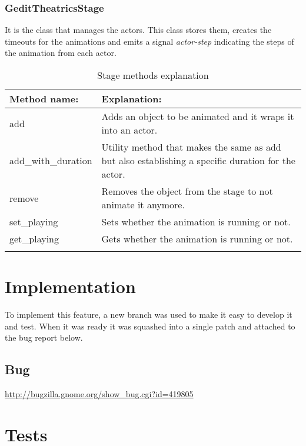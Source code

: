 \newpage
\subsubsection{GeditTheatricsStage}

It is the class that manages the actors. This class stores them, creates the timeouts for the animations and emits a signal \emph{actor-step} indicating the steps of the animation from each actor.

\begin{table}[H]
  \begin{center}
    \begin{tabularx}{\textwidth}{|X|X|}
      \firsthline
      \textbf{Method name:} & \textbf{Explanation:} \\
      \hline
      add & Adds an object to be animated and it wraps it into an actor. \\
      \hline
      add\_with\_duration & Utility method that makes the same as add but also establishing a specific duration for the actor. \\
      \hline
      remove & Removes the object from the stage to not animate it anymore. \\
      \hline
      set\_playing & Sets whether the animation is running or not. \\
      \hline
      get\_playing & Gets whether the animation is running or not. \\
      \lasthline
    \end{tabularx}
    \caption{Stage methods explanation}
  \end{center}
\end{table}

\section{Implementation}

To implement this feature, a new branch was used to make it easy to develop it and test. When it was ready it was squashed into a single patch and attached to the bug report below.

\subsection{Bug}

\url{http://bugzilla.gnome.org/show_bug.cgi?id=419805}

\newpage
\section{Tests}

